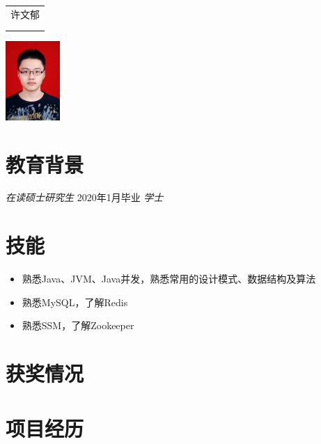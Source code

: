 \documentclass{resume}
\begin{document}

\medskip\noindent
\begin{minipage}{0.7\textwidth}
  \Large{
    \begin{tabu}  { l }
      \scshape{许文郁} \\
       \\
       \\
    \end{tabu}
  }
\end{minipage}
\begin{minipage}{0.3\textwidth}
  \raggedleft
  \includegraphics[height=30mm]{me}
\end{minipage}

\section{  教育背景}
\textit{在读硕士研究生} {2020年1月毕业}
\textit{学士}

\section{技能}
\begin{itemize}[parsep=0.5ex]
  \item 熟悉Java、JVM、Java并发，熟悉常用的设计模式、数据结构及算法
  \item 熟悉MySQL，了解Redis
  \item 熟悉SSM，了解Zookeeper
\end{itemize}

\section{获奖情况}

\section{项目经历}
\end{document}
